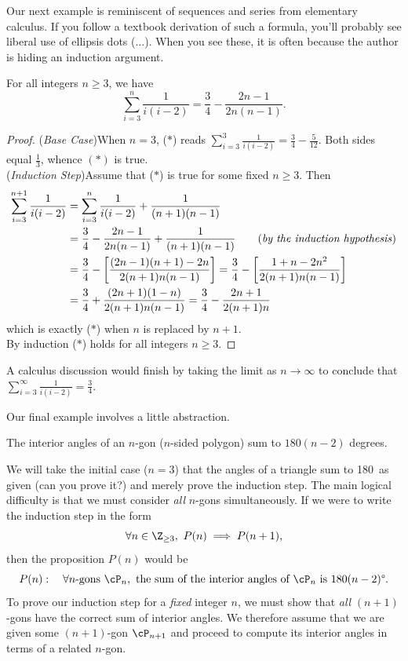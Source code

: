 Our next example is reminiscent of sequences and series from elementary calculus. If you follow a textbook derivation of such a formula, you'll probably see liberal use of ellipsis dots ($\ldots$). When you see these, it is often because the author is hiding an induction argument.

\begin{thm}
For all integers $n\ge 3$, we have
\[\sum\limits_{i=3}^n\frac 1{i(i-2)}=\frac 34-\frac{2n-1}{2n(n-1)}.\tag*{($\ast$)}\]
\end{thm}

\begin{proof}
(\emph{Base Case})\quad When $n=3$, ($\ast$) reads $\sum\limits_{i=3}^3\frac 1{i(i-2)}=\frac 34-\frac 5{12}$. Both sides equal $\frac 13$, whence $(\ast)$ is true.\\
(\emph{Induction Step})\quad Assume that ($\ast$) is true for some fixed $n\ge 3$. Then
\begin{align*}
\sum_{i=3}^{n+1}\frac 1{i(i-2)}&=\sum_{i=3}^{n}\frac 1{i(i-2)}+\frac 1{(n+1)(n-1)}\\
&=\frac 34-\frac{2n-1}{2n(n-1)}+\frac 1{(n+1)(n-1)}\tag*{(\emph{by the induction hypothesis})}\\
&=\frac 34-\left[\frac{(2n-1)(n+1)-2n}{2(n+1)n(n-1)}\right]=\frac 34-\left[\frac{1+n-2n^2}{2(n+1)n(n-1)}\right]\\
&=\frac 34+\frac{(2n+1)(1-n)}{2(n+1)n(n-1)}=\frac 34-\frac{2n+1}{2(n+1)n}
\end{align*}
which is exactly ($\ast$) when $n$ is replaced by $n+1$.\\
By induction ($\ast$) holds for all integers $n\ge 3$.
\end{proof}

\noindent A calculus discussion would finish by taking the limit as $n\to\infty$ to conclude that $\sum\limits_{i=3}^\infty\frac 1{i(i-2)}=\frac 34$.


Our final example involves a little abstraction.

\begin{thm}\label{thm:polygon}
The interior angles of an $n$-gon ($n$-sided polygon) sum to $180(n-2)$ degrees.
\end{thm}

\noindent We will take the initial case ($n=3$) that the angles of a triangle sum to 180\textdegree\ as given (can you prove it?) and merely prove the induction step. The main logical difficulty is that we must consider \emph{all} $n$-gons simultaneously. If we were to write the induction step in the form
\[\forall n\in\Z_{\ge 3},\ P(n)\implies P(n+1),\]
then the proposition $P(n)$ would be
\[P(n):\quad \forall n\text{-gons }\cP_n,\text{ the sum of the interior angles of $\cP_n$ is $180(n-2)$\textdegree.}\]
To prove our induction step for a \emph{fixed} integer $n$, we must show that \emph{all} $(n+1)$-gons have the correct sum of interior angles. We therefore assume that we are given some $(n+1)$-gon $\cP_{n+1}$ and proceed to compute its interior angles in terms of a related $n$-gon.

